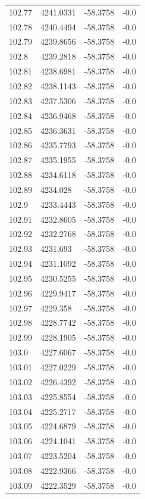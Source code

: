 \begin{table}[H]
\begin{tabular}{llll}
102.77 & 4241.0331 & -58.3758 & -0.0 \\
102.78 & 4240.4494 & -58.3758 & -0.0 \\
102.79 & 4239.8656 & -58.3758 & -0.0 \\
102.8 & 4239.2818 & -58.3758 & -0.0 \\
102.81 & 4238.6981 & -58.3758 & -0.0 \\
102.82 & 4238.1143 & -58.3758 & -0.0 \\
102.83 & 4237.5306 & -58.3758 & -0.0 \\
102.84 & 4236.9468 & -58.3758 & -0.0 \\
102.85 & 4236.3631 & -58.3758 & -0.0 \\
102.86 & 4235.7793 & -58.3758 & -0.0 \\
102.87 & 4235.1955 & -58.3758 & -0.0 \\
102.88 & 4234.6118 & -58.3758 & -0.0 \\
102.89 & 4234.028 & -58.3758 & -0.0 \\
102.9 & 4233.4443 & -58.3758 & -0.0 \\
102.91 & 4232.8605 & -58.3758 & -0.0 \\
102.92 & 4232.2768 & -58.3758 & -0.0 \\
102.93 & 4231.693 & -58.3758 & -0.0 \\
102.94 & 4231.1092 & -58.3758 & -0.0 \\
102.95 & 4230.5255 & -58.3758 & -0.0 \\
102.96 & 4229.9417 & -58.3758 & -0.0 \\
102.97 & 4229.358 & -58.3758 & -0.0 \\
102.98 & 4228.7742 & -58.3758 & -0.0 \\
102.99 & 4228.1905 & -58.3758 & -0.0 \\
103.0 & 4227.6067 & -58.3758 & -0.0 \\
103.01 & 4227.0229 & -58.3758 & -0.0 \\
103.02 & 4226.4392 & -58.3758 & -0.0 \\
103.03 & 4225.8554 & -58.3758 & -0.0 \\
103.04 & 4225.2717 & -58.3758 & -0.0 \\
103.05 & 4224.6879 & -58.3758 & -0.0 \\
103.06 & 4224.1041 & -58.3758 & -0.0 \\
103.07 & 4223.5204 & -58.3758 & -0.0 \\
103.08 & 4222.9366 & -58.3758 & -0.0 \\
103.09 & 4222.3529 & -58.3758 & -0.0 \\

\end{tabular}
\end{table}
